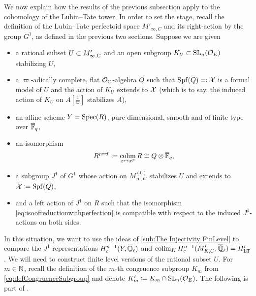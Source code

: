 \documentclass[../main.tex]{subfiles}
\begin{document}
We now explain how the results of the previous subsection apply to the 
cohomology of the Lubin--Tate tower. In order to set the stage, recall the 
definition of the Lubin--Tate perfectoid space $M'_{\infty, C}$ and its
right-action by the group $G^1$, as defined in the previous two sections.
Suppose we are given
\begin{itemize}
  \item a rational subset $U\subset M'_{\infty, {\mathrm{C}}}$ and an open
    subgroup $K_U \subset \operatorname{SL}_n(\mathcal{O}_E)$ stabilizing $U$,
  \item a $\varpi$-adically complete, flat $\mathcal{O}_{\mathrm{C}}$-algebra
    $Q$ such that $\operatorname{Spf}(Q) \eqqcolon \mathcal{X}$ is a formal model of $U$ and the action of 
    $K_U$ extends to $\mathcal{X}$ (which is to say, the induced action of $K_U$ on $A[\tfrac 1\varpi]$ stabilizes $A$),
  \item an affine scheme $Y=\operatorname{Spec}(R)$, pure-dimensional, smooth and 
    of finite type over ${\overline {\mathbb{F}}_q}$,
  \item an isomorphism
    \begin{equation}\label{eq:isoofreductionwithperfection}
      R^{\mathit{perf}} \coloneq \operatorname*{colim}_{x \mapsto x^p} R \cong Q \otimes {\overline{\mathbb{F}}_q},
    \end{equation}
  \item a subgroup $J^1$ of $G^1$ whose action on $M_{\infty, C}^{(0)}$ stabilizes
    $U$ and extends to $\mathcal{X} \coloneq \operatorname{Spf}(Q)$, 
  \item and a left action of $J^1$ on $R$ such that the isomorphism
    \eqref{eq:isoofreductionwithperfection} is compatible with respect to the
    induced $J^1$-actions on both sides.
\end{itemize}
In this situation, we want to use
the ideas of \cref{sub:The Injectivity FinLevel} to compare the $J^1$-representations
$H_c^{n-1}(Y, {\overline {\mathbb{Q}}_\ell})$ and $\operatorname*{colim}_K H_c^{n-1}(M'_{K,C}, {\overline {\mathbb{Q}}_\ell}) = H'_{\mathrm{LT}}$. 
We will need to construct finite level versions of the rational subset $U$. 
For $m \in \mathbb{N}$, recall the definition of the $m$-th congruence subgroup $K_m$ from 
\eqref{eq:defCongruenceSubgroup} and denote $K'_m \coloneq K_m \cap \operatorname{SL}_n(\mathcal{O}_E)$. 
The following is part of \cite[Proposition 4.5]{mieda2016geometric}.
\end{document}
